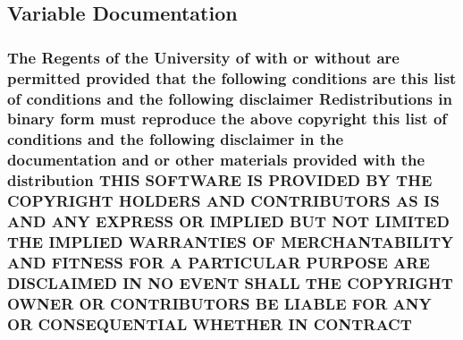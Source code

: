 \subsection{Variable Documentation}
\hypertarget{_l_i_c_e_n_s_e_a7a844151eef8cb86ee78d228151f2d5a}{
\subsubsection[{C\+O\+N\+T\+R\+A\+C\+T}]{\setlength{\rightskip}{0pt plus 5cm}The Regents of the University of with or without are permitted provided that the following conditions are this list of conditions and the following disclaimer Redistributions in binary form must reproduce the above copyright this list of conditions and the following disclaimer in the documentation and or other materials provided with the distribution T\+H\+I\+S S\+O\+F\+T\+W\+A\+R\+E I\+S P\+R\+O\+V\+I\+D\+E\+D B\+Y T\+H\+E C\+O\+P\+Y\+R\+I\+G\+H\+T H\+O\+L\+D\+E\+R\+S A\+N\+D C\+O\+N\+T\+R\+I\+B\+U\+T\+O\+R\+S A\+S I\+S A\+N\+D A\+N\+Y E\+X\+P\+R\+E\+S\+S O\+R I\+M\+P\+L\+I\+E\+D B\+U\+T N\+O\+T L\+I\+M\+I\+T\+E\+D T\+H\+E I\+M\+P\+L\+I\+E\+D {\bf W\+A\+R\+R\+A\+N\+T\+I\+E\+S} O\+F M\+E\+R\+C\+H\+A\+N\+T\+A\+B\+I\+L\+I\+T\+Y A\+N\+D F\+I\+T\+N\+E\+S\+S F\+O\+R A P\+A\+R\+T\+I\+C\+U\+L\+A\+R P\+U\+R\+P\+O\+S\+E A\+R\+E D\+I\+S\+C\+L\+A\+I\+M\+E\+D I\+N N\+O E\+V\+E\+N\+T S\+H\+A\+L\+L T\+H\+E C\+O\+P\+Y\+R\+I\+G\+H\+T O\+W\+N\+E\+R O\+R C\+O\+N\+T\+R\+I\+B\+U\+T\+O\+R\+S B\+E L\+I\+A\+B\+L\+E F\+O\+R A\+N\+Y O\+R C\+O\+N\+S\+E\+Q\+U\+E\+N\+T\+I\+A\+L W\+H\+E\+T\+H\+E\+R I\+N C\+O\+N\+T\+R\+A\+C\+T}}\label{_l_i_c_e_n_s_e_a7a844151eef8cb86ee78d228151f2d5a}
